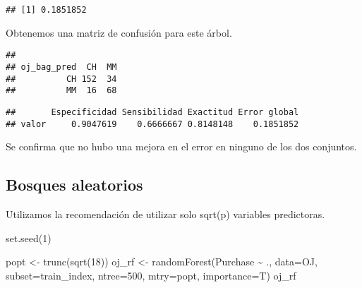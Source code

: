 \documentclass[
]{article}
\newenvironment{Shaded}{\begin{snugshade}}{\end{snugshade}}
\newcommand{\AttributeTok}[1]{\textcolor[rgb]{0.77,0.63,0.00}{#1}}
\newcommand{\DecValTok}[1]{\textcolor[rgb]{0.00,0.00,0.81}{#1}}
\newcommand{\FunctionTok}[1]{\textcolor[rgb]{0.00,0.00,0.00}{#1}}
\newcommand{\NormalTok}[1]{#1}
\newcommand{\OtherTok}[1]{\textcolor[rgb]{0.56,0.35,0.01}{#1}}
\newcommand{\SpecialCharTok}[1]{\textcolor[rgb]{0.00,0.00,0.00}{#1}}
\begin{document}
\begin{verbatim}
## [1] 0.1851852
\end{verbatim}

Obtenemos una matriz de confusión para este árbol.

\begin{Shaded}
\end{Shaded}

\begin{verbatim}
##            
## oj_bag_pred  CH  MM
##          CH 152  34
##          MM  16  68
\end{verbatim}

\begin{Shaded}
\end{Shaded}

\begin{verbatim}
##       Especificidad Sensibilidad Exactitud Error global
## valor     0.9047619    0.6666667 0.8148148    0.1851852
\end{verbatim}

Se confirma que no hubo una mejora en el error en ninguno de los dos
conjuntos.

\hypertarget{bosques-aleatorios}{%
\subsection{Bosques aleatorios}\label{bosques-aleatorios}}

Utilizamos la recomendación de utilizar solo sqrt(p) variables
predictoras.

\begin{Shaded}
\begin{Highlighting}[]
\FunctionTok{set.seed}\NormalTok{(}\DecValTok{1}\NormalTok{)}

\NormalTok{popt }\OtherTok{\textless{}{-}} \FunctionTok{trunc}\NormalTok{(}\FunctionTok{sqrt}\NormalTok{(}\DecValTok{18}\NormalTok{))}
\NormalTok{oj\_rf }\OtherTok{\textless{}{-}} \FunctionTok{randomForest}\NormalTok{(Purchase }\SpecialCharTok{\textasciitilde{}}\NormalTok{ ., }\AttributeTok{data=}\NormalTok{OJ, }\AttributeTok{subset=}\NormalTok{train\_index, }\AttributeTok{ntree=}\DecValTok{500}\NormalTok{, }\AttributeTok{mtry=}\NormalTok{popt, }\AttributeTok{importance=}\NormalTok{T)}
\NormalTok{oj\_rf}
\end{Highlighting}
\end{Shaded}
\end{document}
